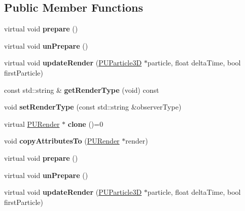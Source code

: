 \subsection*{Public Member Functions}
\begin{DoxyCompactItemize}
\item 
\mbox{\label{classPURender_a30da075fa6e8f39ef34599350c3acd11}} 
virtual void {\bfseries prepare} ()
\item 
\mbox{\label{classPURender_a8f6796756d04a1080305b3151372e0d6}} 
virtual void {\bfseries un\+Prepare} ()
\item 
\mbox{\label{classPURender_a0f64e39013e1cdcd5412e011a65b23cd}} 
virtual void {\bfseries update\+Render} (\hyperlink{structPUParticle3D}{P\+U\+Particle3D} $\ast$particle, float delta\+Time, bool first\+Particle)
\item 
\mbox{\label{classPURender_a75d04ca089236c0d985ea7460e958db0}} 
const std\+::string \& {\bfseries get\+Render\+Type} (void) const
\item 
\mbox{\label{classPURender_acdf563e657b29aa613529c6a43872abb}} 
void {\bfseries set\+Render\+Type} (const std\+::string \&observer\+Type)
\item 
\mbox{\label{classPURender_a7f1139b3e8b20983cffbfe863eba5464}} 
virtual \hyperlink{classPURender}{P\+U\+Render} $\ast$ {\bfseries clone} ()=0
\item 
\mbox{\label{classPURender_a0426b431ba02387081df98cfc550025c}} 
void {\bfseries copy\+Attributes\+To} (\hyperlink{classPURender}{P\+U\+Render} $\ast$render)
\item 
\mbox{\label{classPURender_a30da075fa6e8f39ef34599350c3acd11}} 
virtual void {\bfseries prepare} ()
\item 
\mbox{\label{classPURender_a8f6796756d04a1080305b3151372e0d6}} 
virtual void {\bfseries un\+Prepare} ()
\item 
\mbox{\label{classPURender_ae7b374bec37fc1db48672b672b298449}} 
virtual void {\bfseries update\+Render} (\hyperlink{structPUParticle3D}{P\+U\+Particle3D} $\ast$particle, float delta\+Time, bool first\+Particle)

\end{DoxyCompactItemize}
